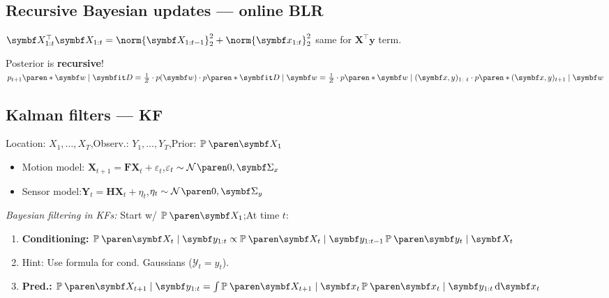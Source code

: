\subsection{Recursive Bayesian updates --- online BLR}



$\symbf X_{1:t}^\top \symbf X_{1:t} = \norm{\symbf X_{1:t-1}}_2^2 + \norm{\symbf x_{1:t}}_2^2$
same for $\symbf{X^\top y}$ term.


Posterior is \textbf{recursive}! $p_{t+1}\paren*{\symbf w \mid \symbfit D} = \frac1Z \cdot p(\symbf w) \cdot p\paren*{\symbfit D \mid \symbf w} \allowbreak= \frac1Z \cdot p\paren*{\symbf w \mid (\symbf x, y)_{1\colon t}} \cdot p\paren*{(\symbf x, y)_{t+1} \mid \symbf w}$


\subsection{Kalman filters --- KF}

Location: $X_1, {\ldots}, X_T$,\enskip Observ.: $Y_1, {\ldots}, Y_T$,\enskip Prior: $\P{\symbf X_1}$
\begin{itemize}
    \item Motion model: $\symbf X_{t+1} = \symbf F \symbf X_t + \varepsilon_t$,\enskip $\varepsilon_t \sim \Gauss{0, \symbf\Sigma_x}$
    \item Sensor model:\quad $\symbf Y_t = \symbf H \symbf X_t + \eta_t$,\enskip $\eta_t \sim \Gauss{0, \symbf\Sigma_y}$
\end{itemize}


\emph{Bayesian filtering in KFs:}
Start w/ $\P{\symbf X_1}$;\enskip At time $t$:
\begin{enumerate}
    \item \textbf{Conditioning:} $\P{\symbf X_t \mid \symbf y_{1:t}} \propto \P{\symbf X_t \mid \symbf y_{1:t-1}} \P{\symbf y_t \mid \symbf X_t}$
    \item[] Hint: Use formula for cond. Gaussians ($\mathcal Y_t {=} y_t$).
    \item \textbf{Pred.:} $\P{\symbf X_{t+1} \mid \symbf y_{1:t}} = \int \P{\symbf X_{t+1} \mid \symbf x_t} \P{\symbf x_t \mid \symbf y_{1:t}} \diff\symbf x_t$
\end{enumerate}

